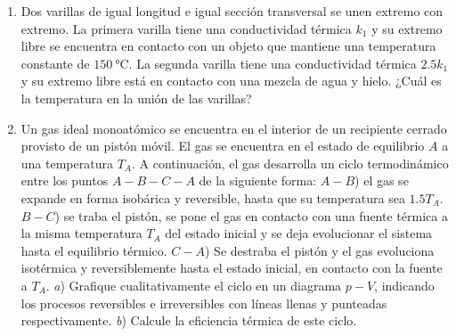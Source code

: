 \documentclass[a4paper,11pt,dvipsnames]{article}
\begin{document}
\begin{enumerate}[leftmargin=*]
  \textit{a}) ¿Cuánto calor intercambia el cadmio?\\
  \textit{b}) ¿Qué masa de agua contiene el recipiente?\\
  \textit{c}) ¿Cuál es la variación de entropía del cadmio?


  \item Dos varillas de igual longitud e igual sección transversal se unen extremo con extremo. La primera varilla tiene una conductividad térmica $k_1$ y su extremo libre se encuentra en contacto con un objeto que mantiene una temperatura constante de $\SI{150}{\celsius}$. La segunda varilla tiene una conductividad térmica $2.5k_1$ y su extremo libre está en contacto con una mezcla de agua y hielo. ¿Cuál es la temperatura en la unión de las varillas?

\item Un gas ideal monoatómico se encuentra en el interior de un recipiente cerrado provisto de un pistón móvil. El gas se encuentra en el estado de equilibrio $A$ a una temperatura $T_A$. A continuación, el gas desarrolla un ciclo termodinámico entre los puntos $A-B-C-A$ de la siguiente forma: $A-B$) el gas se expande en forma isobárica y reversible, hasta que su temperatura sea $1.5T_A$. $B-C$) se traba el pistón, se pone el gas en contacto con una fuente térmica a la misma temperatura $T_A$ del estado inicial y se deja evolucionar el sistema hasta el equilibrio térmico. $C-A$) Se destraba el pistón y el gas evoluciona isotérmica y reversiblemente hasta el estado inicial, en contacto con la fuente a $T_A$. \textit{a}) Grafique cualitativamente el ciclo en un diagrama $p-V$, indicando los procesos reversibles e irreversibles con líneas llenas y punteadas respectivamente. \textit{b}) Calcule la eficiencia térmica de este ciclo. 
\end{enumerate}
\end{document}
